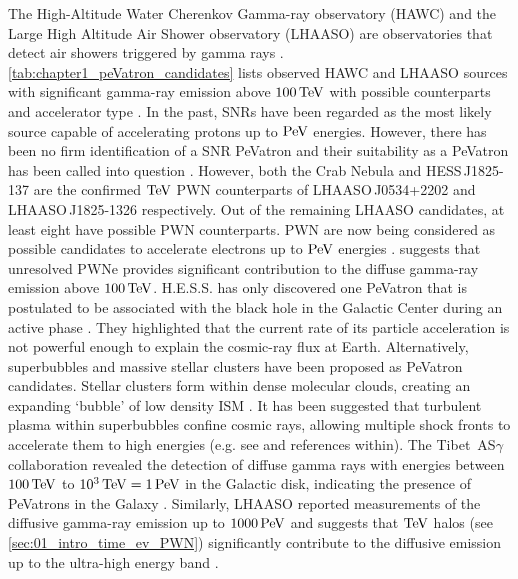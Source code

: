 The High-Altitude Water Cherenkov Gamma-ray observatory (HAWC) and the Large High Altitude Air Shower observatory (LHAASO) are observatories that detect air showers triggered by gamma rays \citep{LHAASO_website, HAWC}. \autoref{tab:chapter1_peVatron_candidates} lists observed HAWC and LHAASO sources with significant gamma-ray emission above $100\,\TeV$ with possible counterparts and accelerator type \citep{PhysRevLett.124.021102,2021Natur.594...33C}. In the past, SNRs have been regarded as the most likely source capable of accelerating protons up to $\PeV$ energies. However, there has been no firm identification of a SNR PeVatron and their suitability as a PeVatron has been called into question \citep{10.1093/mnras/sty1589,2019IJMPD..2830022G,2021Univ....7..324C,2022MNRAS.516..492B}. However, both the Crab Nebula and \mbox{HESS\,J1825-137} are the confirmed $\TeV$ PWN counterparts of \mbox{LHAASO\,J0534+2202} and \mbox{LHAASO\,J1825-1326} respectively. Out of the remaining LHAASO candidates, at least eight have possible PWN counterparts. PWN are now being considered as possible candidates to accelerate electrons up to $\PeV$ energies \citep{2021ApJ...908L..49B,de_O_a_Wilhelmi_2022}. \cite{2022ApJ...928...19V} suggests that unresolved PWNe provides significant contribution to the diffuse gamma-ray emission above $100\,\TeV$.
\newpar
H.E.S.S. has only discovered one PeVatron that is postulated to be associated with the black hole in the Galactic Center during an active phase \citep{2016Natur.531..476H}. They highlighted that the current rate of its particle acceleration is not powerful enough to explain the cosmic-ray flux at Earth.  Alternatively, superbubbles and massive stellar clusters have been proposed as PeVatron candidates. Stellar clusters form within dense molecular clouds, creating an expanding `bubble' of low density ISM \citep{1998LNP...506..399I}. It has been suggested that turbulent plasma within superbubbles confine cosmic rays, allowing multiple shock fronts to accelerate them to high energies (e.g. see \cite{2022MNRAS.515.2256V} and references within).
\newpar 
The \mbox{Tibet AS$\gamma$} collaboration revealed the detection of diffuse gamma rays with energies between $100\,\TeV$ to $10^3\,\TeV=1\,\PeV$ in the Galactic disk, indicating the presence of PeVatrons in the Galaxy \citep{PhysRevLett.126.141101}. Similarly, LHAASO reported measurements of the diffusive gamma-ray emission up to $1000\,\PeV$ and suggests that $\TeV$ halos (see \autoref{sec:01_intro_time_ev_PWN}) significantly contribute to the diffusive emission up to the ultra-high energy band \citep{2023arXiv230505372C}.


